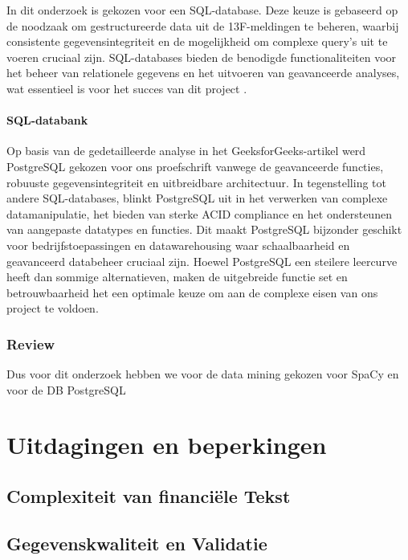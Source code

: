 In dit onderzoek is gekozen voor een SQL-database. Deze keuze is gebaseerd op de noodzaak om gestructureerde data uit de 13F-meldingen te beheren, waarbij consistente gegevensintegriteit en de mogelijkheid om complexe query’s uit te voeren cruciaal zijn. SQL-databases bieden de benodigde functionaliteiten voor het beheer van relationele gegevens en het uitvoeren van geavanceerde analyses, wat essentieel is voor het succes van dit project \autocite{khan2023performance}.

\paragraph{SQL-databank}
Op basis van de gedetailleerde analyse in het GeeksforGeeks-artikel werd PostgreSQL gekozen voor ons proefschrift vanwege de geavanceerde functies, robuuste gegevensintegriteit en uitbreidbare architectuur. In tegenstelling tot andere SQL-databases, blinkt PostgreSQL uit in het verwerken van complexe datamanipulatie, het bieden van sterke ACID compliance en het ondersteunen van aangepaste datatypes en functies. Dit maakt PostgreSQL bijzonder geschikt voor bedrijfstoepassingen en datawarehousing waar schaalbaarheid en geavanceerd databeheer cruciaal zijn. Hoewel PostgreSQL een steilere leercurve heeft dan sommige alternatieven, maken de uitgebreide functie set en betrouwbaarheid het een optimale keuze om aan de complexe eisen van ons project te voldoen.

\subsubsection{Review}
Dus voor dit onderzoek hebben we voor de data mining gekozen voor SpaCy en voor de DB PostgreSQL








\section{Uitdagingen en beperkingen}
\subsection{Complexiteit van financiële Tekst}
\subsection{Gegevenskwaliteit en Validatie}
